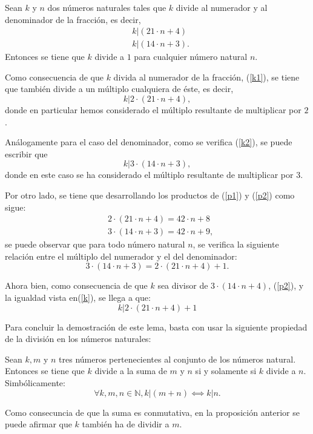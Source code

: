 \begin{lema}\label{lema}
  Sean \(k\) y \(n\) dos números naturales tales que \(k\) divide al
  numerador y al denominador de la fracción, es decir,
  \begin{align}
    & k | (21⋅n+4)   \label{k1} \\
    & k | (14⋅n+3).  \label{k2}
  \end{align}
  Entonces se tiene que \(k\) divide a \(1\) para cualquier número
  natural \(n\).
\end{lema}
\begin{demostracion}
  Como consecuencia de que \(k\) divida al numerador de la fracción,
  (\ref{k1}), se tiene que también divide a un múltiplo cualquiera de
  éste, es decir,
  \begin{equation}\label{p1}
    k | 2⋅(21⋅n+4),
  \end{equation}
  donde en particular hemos considerado el múltiplo resultante de
  multiplicar por \(2\).

  Análogamente para el caso del denominador, como se verifica (\ref{k2}),
  se puede escribir que
  \begin{equation}\label{p2}
    k | 3⋅(14⋅n+3),
  \end{equation}
  donde en este caso se ha considerado el múltiplo resultante de
  multiplicar por \(3\).

  Por otro lado, se tiene que desarrollando los productos de (\ref{p1}) y
  (\ref{p2}) como sigue:
  \begin{align}
    & 2⋅ (21⋅n+4)=42⋅n+8    \\
    & 3·(14·n+3)=42·n+9, 
  \end{align}
  se puede observar que para todo número natural \(n\), se verifica la
  siguiente relación entre el múltiplo del numerador y el del denominador:
  \begin{equation}\label{k}
    3⋅(14⋅n+3)=2⋅(21⋅n+4)+1.
  \end{equation}

  Ahora bien, como consecuencia de que \(k\) sea divisor de \(3⋅(14⋅n+4) \),
  (\ref{p2}), y la igualdad vista en(\ref{k}), se llega a que:
  \begin{equation}\label{div1}
    k|2⋅(21⋅n+4)+1
  \end{equation}

  Para concluir la demostración de este lema, basta con usar la siguiente
  propiedad de la división en los números naturales:
  
  \begin{proposicion}\label{divn}
    Sean \(k,m\) y \(n\) tres números pertenecientes al conjunto de los
    números natural. Entonces se tiene que \(k\) divide a la suma de
    \(m\) y \(n\) si y solamente si \(k\) divide a \(n\). Simbólicamente:
    \begin{equation}
      ∀k,m,n ∈ ℕ, k | (m+n)⟺k|n.
    \end{equation}
  \end{proposicion}
  \begin{nota}
    Como consecuncia de que la suma es conmutativa, en la proposición
    anterior se puede afirmar que \(k\) también ha de dividir a \(m\).
  \end{nota}
  

\end{demostracion}
